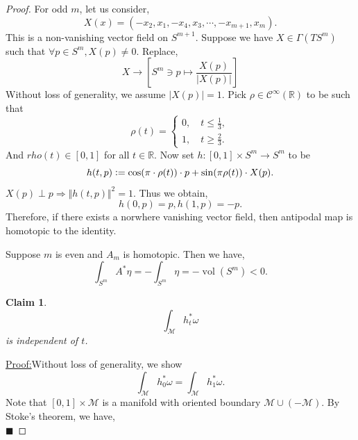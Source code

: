 \documentclass[8pt]{article}
\newtheorem{claim}{Claim}
\newenvironment{claimproof}[1]{\par\noindent\underline{Proof:}\space#1}{\hfill $\blacksquare$}
\DeclareMathOperator{\vol}{vol}
\newcommand{\defeq}{\vcentcolon=}
\newcommand{\norm}[1]{\Vert #1 \Vert}
\newcommand{\R}[0]{\mathbb{R}}
\newcommand{\M}[0]{\mathcal{M}}
\newcommand{\cinf}[0]{\mathcal{C}^\infty}
\begin{document}
\begin{proof}
  For odd $m$, let us consider,
  \begin{equation*}
    X(x) = (-x_2,x_1,-x_4,x_3,\cdots,-x_{m+1},x_m).
  \end{equation*}
  This is a non-vanishing vector field on $S^{m+1}$. Suppose we have $X\in\Gamma(TS^m)$ such that $\forall p\in S^m,X(p)\not=0$. Replace,
  \begin{equation*}
    X\to \left[S^m\ni p\mapsto {\frac {X(p)}{\vert X(p)\vert}}\right]
  \end{equation*}
  Without loss of generality, we assume $\vert X(p)\vert = 1$. Pick $\rho\in\cinf(\R)$ to be such that 
  \begin{equation*}
    \rho(t) = \begin{cases}
      0,\quad t\leq {\frac 1 3},\\
      1,\quad t\geq{\frac 2 3}.
    \end{cases}
  \end{equation*}
  And $rho(t)\in[0,1]$ for all $t\in\R$. Now set $h:[0,1]\times S^m\to S^m$ to be
  \begin{equation*}
    h(t,p)\defeq\cos(\pi\cdot\rho(t))\cdot p+\sin(\pi\rho(t))\cdot X(p).
  \end{equation*}
  $X(p)\perp p\Rightarrow \norm{h(t,p)}^2=1$. Thus we obtain,
  \begin{equation*}
    h(0,p) = p,h(1,p) = -p.
  \end{equation*}
  Therefore, if there exists a norwhere vanishing vector field, then antipodal map is homotopic to the identity.
  \par Suppose $m$ is even and $A_m$ is homotopic. 
  Then we have,
  \begin{equation*}
    \int_{S^m}A^*\eta = -\int_{S^m}\eta = -\vol(S^m)<0.
  \end{equation*}
  \begin{claim}
    \begin{equation*}
      \int_\M h_t^*\omega
    \end{equation*}
    is independent of $t$. 
  \end{claim}
  \begin{claimproof}
    Without loss of generality, we show 
    \begin{equation*}
      \int_\M h^*_0\omega = \int_\M h^*_1\omega.
    \end{equation*}
    Note that $[0,1]\times \M$ is a manifold with oriented boundary $\M\cup(-\M)$. By Stoke's theorem, we have,
    \begin{equation*}

\end{equation*}
\end{claimproof}
\end{proof}
\end{document}
